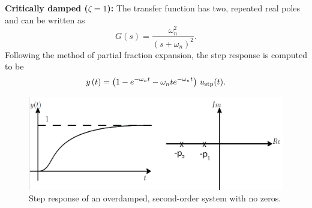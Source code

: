 \textbf{Critically damped ($\zeta=1$):} The transfer function has two, repeated real poles and can be written as
\begin{equation}
G\left( s \right)= \frac{\omega _n^2 }{\left( s + \omega _n  \right)^2 }.
\end{equation}
Following the method of partial fraction expansion, the step response is computed to be
\begin{equation}
\label{eqn:TransientResponse:CriticallyampedStepResponse}
y\left( t \right) = \left(1 - e^{ - \omega_n t}  - \omega_n te^{ - \omega_n t}\right)\, u_{\rm stp}(t).
\end{equation}


\bigskip
{}


\begin{figure}[!h]
	\centering
		\includegraphics[width=0.90\linewidth]{graphics/Chap10/StepResponseOverDampedAndPoleZeroPlot.png}
	\caption{Step response of an overdamped, second-order system with no zeros.}
	\label{fig:TransientResponse:StepResponseOverDamped}
\end{figure}

